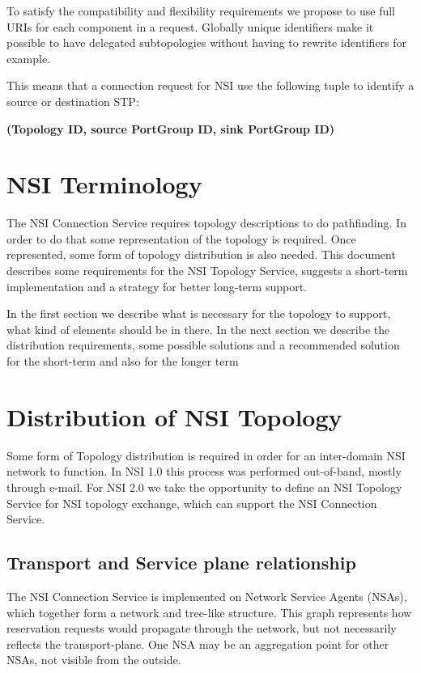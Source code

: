 \documentclass[12pt]{article}  %
\begin{document}
To satisfy the compatibility and flexibility requirements we propose 
to use full URIs for each component in a request. Globally unique identifiers make 
it possible to have delegated subtopologies without having to rewrite identifiers 
for example.

This means that a connection request for NSI \SHOULD{} use the following 
tuple to identify a source or destination STP:

 \textbf{(Topology ID, source PortGroup ID, sink PortGroup ID)}
 
\section{NSI Terminology}

 The NSI Connection Service requires topology descriptions to do 
pathfinding. In order to do that some representation of the topology is required. 
Once represented, some form of topology distribution is also needed. This document 
describes some requirements for the NSI Topology Service, suggests a short-term 
implementation and a strategy for better long-term support.

 In the first section we describe what is necessary for the topology 
to support, what kind of elements should be in there. In the next section we describe 
the distribution requirements, some possible solutions and a recommended solution 
for the short-term and also for the longer term


\section{Distribution of NSI Topology}

 Some form of Topology distribution is required in order for an 
inter-domain NSI network to function. In NSI 1.0 this process was performed out-of-band, 
mostly through e-mail. For NSI 2.0 we take the opportunity to define an NSI Topology 
Service for NSI topology exchange, which can support the NSI Connection Service.


\subsection{Transport and Service plane relationship}

 The NSI Connection Service is implemented on Network Service Agents 
(NSAs), which together form a network and tree-like structure. This graph represents 
how reservation requests would propagate through the network, but not necessarily 
reflects the transport-plane. One NSA may be an aggregation point for other NSAs, 
not visible from the outside.
\end{document}
